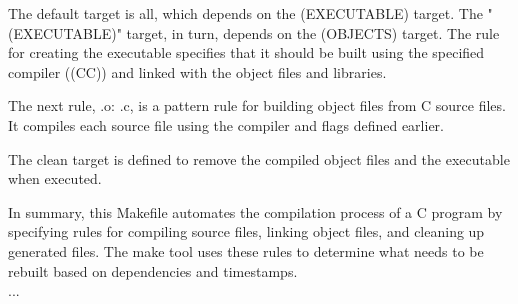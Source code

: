 \documentclass[12pt]{article}
\begin{document}
The default target is all, which depends on the (EXECUTABLE) target. The "(EXECUTABLE)" target, in turn, depends on the (OBJECTS) target. The rule for creating the executable specifies that it should be built using the specified compiler ((CC)) and linked with the object files and libraries.

The next rule, .o: .c, is a pattern rule for building object files from C source files. It compiles each source file using the compiler and flags defined earlier.

The clean target is defined to remove the compiled object files and the executable when executed.

In summary, this Makefile automates the compilation process of a C program by specifying rules for compiling source files, linking object files, and cleaning up generated files. The make tool uses these rules to determine what needs to be rebuilt based on dependencies and timestamps.\\
...
\end{document}
